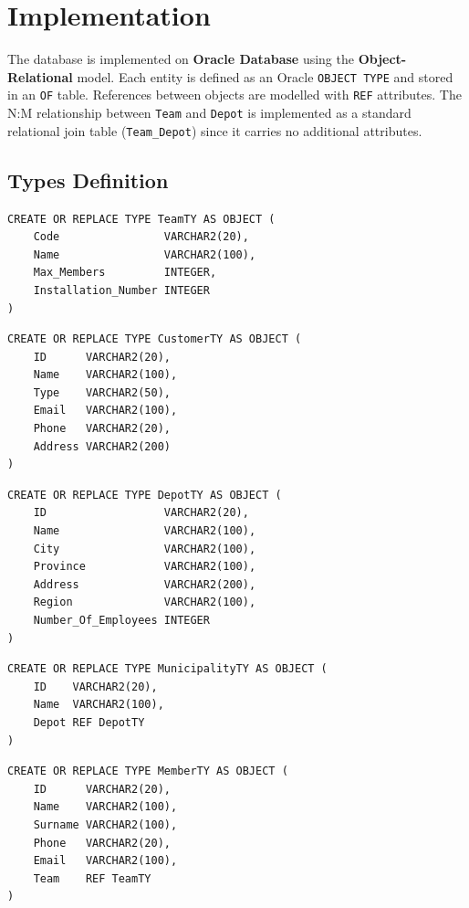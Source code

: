 \section{Implementation}
The database is implemented on \textbf{Oracle Database} using the \textbf{Object-Relational} model.
Each entity is defined as an Oracle \texttt{OBJECT TYPE} and stored in an \texttt{OF} table.
References between objects are modelled with \texttt{REF} attributes.
The N:M relationship between \texttt{Team} and \texttt{Depot} is implemented as a standard relational
join table (\texttt{Team\_Depot}) since it carries no additional attributes.

\subsection{Types Definition}

\begin{lstlisting}
CREATE OR REPLACE TYPE TeamTY AS OBJECT (
    Code                VARCHAR2(20),
    Name                VARCHAR2(100),
    Max_Members         INTEGER,
    Installation_Number INTEGER
)
\end{lstlisting}

\begin{lstlisting}
CREATE OR REPLACE TYPE CustomerTY AS OBJECT (
    ID      VARCHAR2(20),
    Name    VARCHAR2(100),
    Type    VARCHAR2(50),
    Email   VARCHAR2(100),
    Phone   VARCHAR2(20),
    Address VARCHAR2(200)
)
\end{lstlisting}

\begin{lstlisting}
CREATE OR REPLACE TYPE DepotTY AS OBJECT (
    ID                  VARCHAR2(20),
    Name                VARCHAR2(100),
    City                VARCHAR2(100),
    Province            VARCHAR2(100),
    Address             VARCHAR2(200),
    Region              VARCHAR2(100),
    Number_Of_Employees INTEGER
)
\end{lstlisting}

\begin{lstlisting}
CREATE OR REPLACE TYPE MunicipalityTY AS OBJECT (
    ID    VARCHAR2(20),
    Name  VARCHAR2(100),
    Depot REF DepotTY
)
\end{lstlisting}

\begin{lstlisting}
CREATE OR REPLACE TYPE MemberTY AS OBJECT (
    ID      VARCHAR2(20),
    Name    VARCHAR2(100),
    Surname VARCHAR2(100),
    Phone   VARCHAR2(20),
    Email   VARCHAR2(100),
    Team    REF TeamTY
)
\end{lstlisting}

